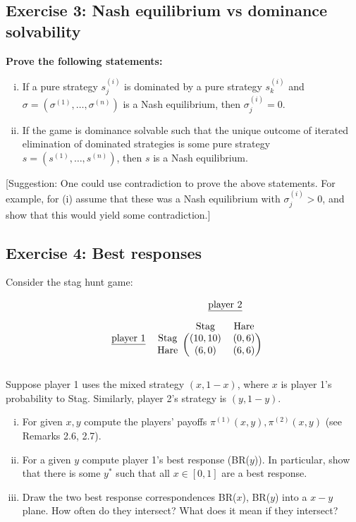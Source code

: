 \documentclass[10pt]{article}
\begin{document}
\subsection*{Exercise 3: Nash equilibrium vs dominance solvability}

\textbf{Prove the following statements:}

\begin{enumerate}[(i)]
    \item If a pure strategy \(s^{(i)}_{j}\) is dominated by a pure strategy \(s^{(i)}_{k}\) and
    \(\sigma = (\sigma^{(1)}, \dots, \sigma^{(n)})\) is a Nash equilibrium, then
    \(\sigma^{(i)}_{j}=0\).
    \item If the game is dominance solvable such that the unique outcome of
    iterated elimination of dominated strategies is some pure strategy
    \(s=(s^{(1)}, \dots, s^{(n)})\), then \(s\) is a Nash equilibrium.
\end{enumerate}

[Suggestion: One could use contradiction to prove the above statements. For example, for (i)
assume that these was a Nash equilibrium with \(\sigma^{(i)}_{j}>0\), and show
that this would yield some contradiction.]

\subsection*{Exercise 4: Best responses}

Consider the stag hunt game:

\begin{equation*}
    \begin{blockarray}{cccc}
       & & \BAmulticolumn{2}{c}{\underline{\text{player 2}}} \\ [1em]
       & & \text{Stag} & \text{Hare} \\
        \begin{block}{cc(cc)}
\underline{\text{player 1}} & \text{Stag} & (10, 10) & (0, 6) \\
                            & \text{Hare} & (6, 0) & (6, 6) \\
        \end{block}
    \end{blockarray}
\end{equation*}

Suppose player 1 uses the mixed strategy \((x, 1- x)\), where \(x\) is player 1's
probability to Stag. Similarly, player 2's strategy is \((y, 1 - y)\).

\begin{enumerate}[(i)]
    \item For given \(x, y\) compute the players' payoffs \(\pi^{(1)}(x, y),
    \pi^{(2)}(x, y)\) (see Remarks 2.6, 2.7).
    \item For a given \(y\) compute player 1's best response (BR(\(y\))). In
    particular, show that there is some \(y^{*}\) such that all \(x \in [0,
    1]\) are a best response.
    \item Draw the two best response correspondences BR(\(x\)), BR(\(y\)) into a
    \(x-y\) plane. How often do they intersect? What does it mean if they
    intersect?
\end{enumerate}
\end{document}
